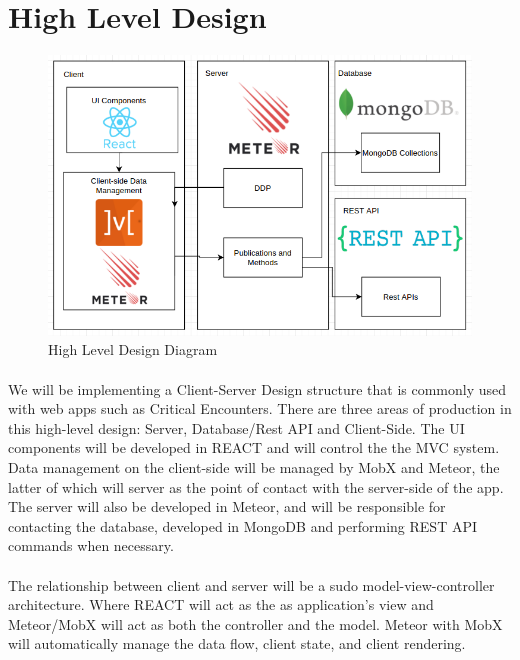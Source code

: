 \documentclass[12pt,a4paper]{report}
\begin{document}
	\section {High Level Design}
	\begin{figure}[h]
		\includegraphics[scale=.5]{designsd.png}
		\caption{High Level Design Diagram}
		\label{fig: High Level Design}
	\end{figure}
	
	\paragraph{}We will be implementing a Client-Server Design structure that is commonly used with web apps such as Critical Encounters. There are three areas of production in this high-level design: Server, Database/Rest API and Client-Side. The UI components will be developed in REACT and will control the the MVC system. Data management on the client-side will be managed by MobX and Meteor, the latter of which will server as the point of contact with the server-side of the app. The server will also be developed in Meteor, and will be responsible for contacting the database, developed in MongoDB and performing REST API commands when necessary. 
	
	\paragraph {} The relationship between client and server will be a sudo model-view-controller architecture. Where REACT will act as the as application's view and Meteor/MobX will act as both the controller and the model. Meteor with MobX will automatically manage the data flow, client state, and client rendering.
	
\end{document}
